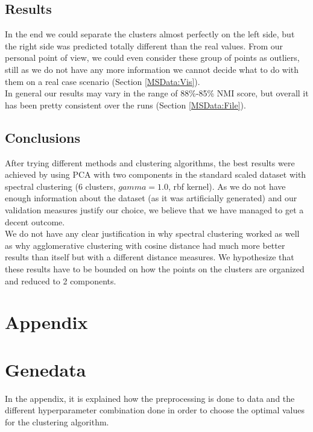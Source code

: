 \documentclass[12pt]{article}
\begin{document}
\subsection{Results}
In the end we could separate the clusters almost perfectly on the left side, but the right side was predicted totally different than the real values. From our personal point of view, we could even  consider these group of points as outliers, still as we do not have any more information we cannot decide what to do with them on a real case scenario (Section \ref{MSData:Vis}). \\

In general our results may vary in the range of 88\%-85\% NMI score, but overall it has been pretty consistent over the runs (Section \ref{MSData:File}). 

\subsection{Conclusions}
After trying different methods and clustering algorithms, the best results were achieved by using PCA with two components in the standard scaled dataset with spectral clustering (6 clusters, $gamma=1.0$, rbf kernel). As we do not have enough information about the dataset (as it was artificially generated) and our validation measures justify our choice, we believe that we have managed to get a decent outcome. \\

We do not have any clear justification in why spectral clustering worked as well as why agglomerative clustering with cosine distance had much more better results than itself but with a different distance measures. We hypothesize that these results have to be bounded on how the points on the clusters are organized and reduced to 2 components.

\clearpage

\section{Appendix}
\appendix

\section{Genedata}

In the appendix, it is explained how the preprocessing is done to data and the different hyperparameter combination done in order to choose the optimal values for the clustering algorithm.
\end{document}
